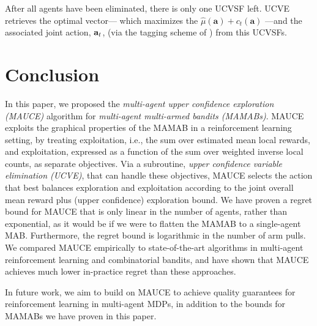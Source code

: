 \documentclass{article}
\newcommand{\est}{\hat{\mu}}
\begin{document}

After all agents have been eliminated, there is only one UCVSF left. UCVE retrieves the optimal vector--- which maximizes the $\est(\mathbf{a}) + c_t(\mathbf{a})$ ---and the associated joint action, ${\bf a}_t$, (via the tagging scheme of \cite{roijers2015computing}) from this UCVSFs.





\section{Conclusion}
In this paper, we proposed the \emph{multi-agent upper confidence exploration (MAUCE)} algorithm for \emph{multi-agent multi-armed bandits (MAMABs)}. MAUCE exploits the graphical properties of the MAMAB in a reinforcement learning setting, by treating exploitation, i.e., the sum over estimated mean local rewards, and exploitation, expressed as a function of the sum over weighted inverse local counts, as separate objectives. Via a subroutine, \emph{upper confidence variable elimination (UCVE)}, that can handle these objectives, MAUCE selects the action that best balances exploration  and exploitation according to the joint overall mean reward plus (upper confidence) exploration bound. We have proven a regret bound for MAUCE that is only linear in the number of agents, rather than exponential, as it would be if we were to flatten the MAMAB to a single-agent MAB. Furthermore, the regret bound is logarithmic in the number of arm pulls. 
We compared MAUCE empirically to state-of-the-art algorithms in multi-agent reinforcement learning and combinatorial bandits, and have shown that MAUCE achieves much lower in-practice regret than these approaches.

In future work, we aim to build on MAUCE to achieve quality guarantees for reinforcement learning in multi-agent MDPs, in addition to the bounds for MAMABs we have proven in this paper. 





\end{document}
